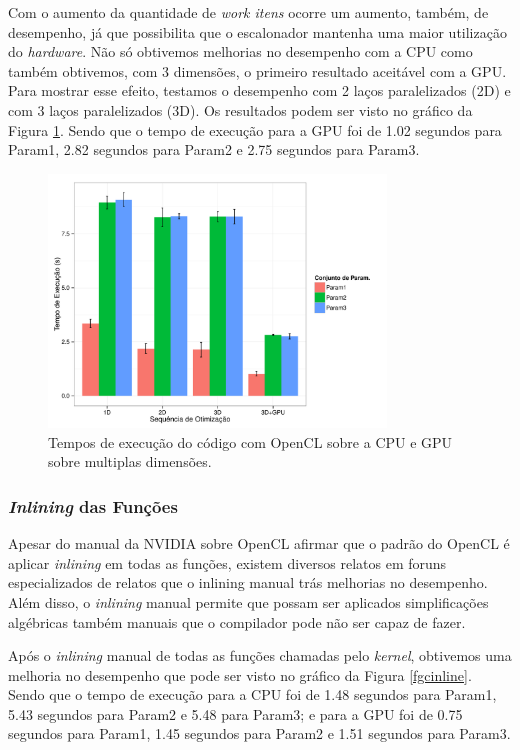 \documentclass[12pt]{article}
\begin{document}
Com o aumento da quantidade de \textit{work itens} ocorre um aumento, também, de desempenho, já que possibilita que o escalonador mantenha uma maior utilização do \textit{hardware}. Não só obtivemos melhorias no desempenho com a CPU como também obtivemos, com 3 dimensões, o primeiro resultado aceitável com a GPU. Para mostrar esse efeito, testamos o desempenho com 2 laços paralelizados (2D) e com 3 laços paralelizados (3D). Os resultados podem ser visto no gráfico da Figura \ref{fgcl3d}. Sendo que o tempo de execução para a GPU foi de 1.02 segundos para Param1, 2.82 segundos para Param2 e 2.75 segundos para Param3. 

\begin{figure}[H]
\centering
\includegraphics[width=0.8\textwidth]{ocl3d.pdf}
\caption{Tempos de execução do código com OpenCL sobre a CPU e GPU sobre multiplas dimensões.}
\label{fgcl3d}
\end{figure}

\subsubsection{\textit{Inlining} das Funções}

Apesar do manual da NVIDIA sobre OpenCL afirmar que o padrão do OpenCL é aplicar \textit{inlining} em todas as funções, existem diversos relatos em foruns especializados de relatos que o inlining manual trás melhorias no desempenho. Além disso, o \textit{inlining} manual permite que possam ser aplicados simplificações algébricas também manuais que o compilador pode não ser capaz de fazer. 

Após o \textit{inlining} manual de todas as funções chamadas pelo \textit{kernel}, obtivemos uma melhoria no desempenho que pode ser visto no gráfico da Figura \ref{fgcinline}. Sendo que o tempo de execução para a CPU foi de 1.48 segundos para Param1, 5.43 segundos para Param2 e 5.48 para Param3; e para a GPU foi de 0.75 segundos para Param1, 1.45 segundos para Param2 e 1.51 segundos para Param3.
\end{document}
